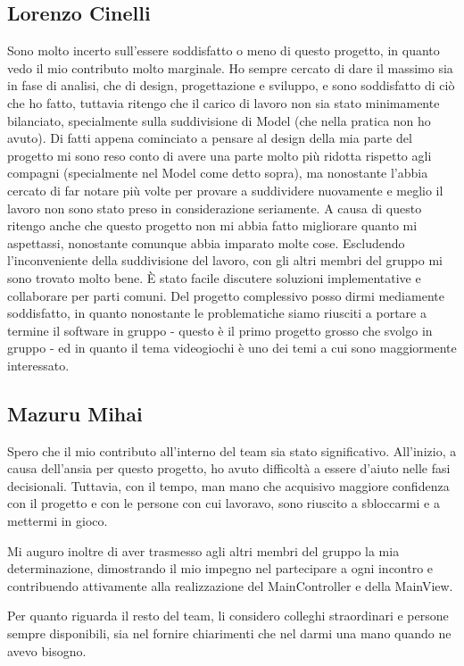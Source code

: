 \documentclass[a4paper,12pt]{report}
\begin{document}
\subsection{Lorenzo Cinelli}

Sono molto incerto sull'essere soddisfatto o meno di questo progetto, in quanto vedo il mio contributo molto marginale. Ho sempre cercato di dare il massimo sia in fase di analisi,
che di design, progettazione e sviluppo, e sono soddisfatto di ciò che ho fatto, tuttavia ritengo che il carico di lavoro non sia stato minimamente bilanciato, specialmente sulla
suddivisione di Model (che nella pratica non ho avuto). Di fatti appena cominciato a pensare al design della mia parte del progetto mi sono reso conto di avere una parte molto più
ridotta rispetto agli compagni (specialmente nel Model come detto sopra), ma nonostante l'abbia cercato di far notare più volte per provare a suddividere nuovamente e meglio il lavoro
non sono stato preso in considerazione seriamente. 
A causa di questo ritengo anche che questo progetto non mi abbia fatto migliorare quanto mi aspettassi, nonostante comunque abbia imparato molte cose.
Escludendo l'inconveniente della suddivisione del lavoro, con gli altri membri del gruppo mi sono trovato molto bene. È stato facile discutere soluzioni implementative e collaborare
per parti comuni.
Del progetto complessivo posso dirmi mediamente soddisfatto, in quanto nonostante le problematiche siamo riusciti a portare a termine il software in gruppo - questo è il primo
progetto grosso che svolgo in gruppo - ed in quanto il tema videogiochi è uno dei temi a cui sono maggiormente interessato. 

\subsection{Mazuru Mihai}
Spero che il mio contributo all'interno del team sia stato significativo. All'inizio, a causa dell'ansia per questo progetto, ho avuto difficoltà a essere d'aiuto nelle fasi decisionali. Tuttavia, con il tempo, man mano che acquisivo maggiore confidenza con il progetto e con le persone con cui lavoravo, sono riuscito a sbloccarmi e a mettermi in gioco.

Mi auguro inoltre di aver trasmesso agli altri membri del gruppo la mia determinazione, dimostrando il mio impegno nel partecipare a ogni incontro e contribuendo attivamente alla realizzazione del MainController e della MainView.

Per quanto riguarda il resto del team, li considero colleghi straordinari e persone sempre disponibili, sia nel fornire chiarimenti che nel darmi una mano quando ne avevo bisogno.
\end{document}
